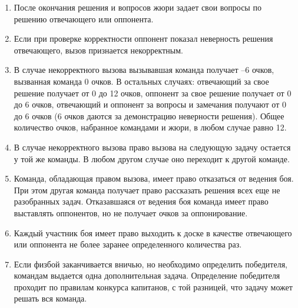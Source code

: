 \documentclass[11pt]{article}
\begin{document}
\begin{enumerate}
\item После окончания решения и вопросов жюри задает свои вопросы по
  решению отвечающего или оппонента.
\item Если при проверке корректности оппонент показал неверность
  решения отвечающего, вызов признается некорректным.
\item В случае некорректного вызова вызывавшая команда получает –6
  очков, вызванная команда 0 очков. В остальных случаях: отвечающий за
  свое решение получает от 0 до 12 очков, оппонент за свое решение
  получает от 0 до 6 очков, отвечающий и оппонент за вопросы и
  замечания получают от 0 до 6 очков (6 очков даются за демонстрацию
  неверности решения). Общее количество очков, набранное командами и
  жюри, в любом случае равно 12.
\item В случае некорректного вызова право вызова на следующую задачу
  остается у той же команды. В любом другом случае оно переходит к
  другой команде.
\item Команда, обладающая правом вызова, имеет право отказаться от
  ведения боя. При этом другая команда получает право рассказать
  решения всех еще не разобранных задач. Отказавшаяся от ведения боя
  команда имеет право выставлять оппонентов, но не получает очков за
  оппонирование.
\item Каждый участник боя имеет право выходить к доске в качестве
  отвечающего или оппонента не более заранее определенного количества
  раз.
\item Если физбой заканчивается вничью, но необходимо определить
  победителя, командам выдается одна дополнительная
  задача. Определение победителя проходит по правилам конкурса
  капитанов, с той разницей, что задачу может решать вся команда.
\end{enumerate}
\end{document}
